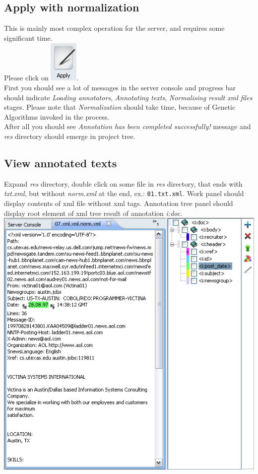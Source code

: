\documentclass[12pt]{article}
\begin{document}
\subsection{Apply with normalization}
This is mainly most complex operation for the server, and requires some significant time.\\
Please click on \includegraphics[scale=0.6]{04ApplyButton.png}.\\
First you should see a lot of messages in the server console and progress bar should indicate \emph{Loading annotators}, \emph{Annotating texts}, \emph{Normalising result xml files} stages. Please note that \emph{Normalization} should take time, because of Genetic Algorithms invoked in the process.\\
After all you should see \emph{Annotation has been completed successfully!} message and \emph{res} directory should emerge in project tree.

\subsection{View annotated texts}
Expand \emph{res} directory, double click on some file in \emph{res} directory, that ends with \emph{txt.xml}, but without \emph{norm.xml} at the end, ex.: \texttt{01.txt.xml}.
Work panel should display contents of xml file without xml tags. Annotation tree panel should display root element of xml tree result of annotation \emph{i:doc}.\\
\includegraphics[scale=0.6]{05AnnotationPanel.png}
\end{document}
